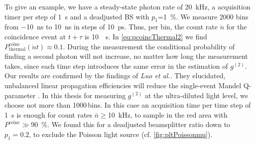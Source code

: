 To give an example, we have a steady-state photon rate of \SI{20}{\kHz}, a acquisition timer per step of \SI{1}{\s} and a deadjusted \ac{BS} with $p_1$=\SI{1}{\percent}. We measure 2000 bins from \SI{-10}{\ns} to \SI{+10}{\ns} in steps of \SI{10}{\ps}. Thus, per bin, the count rate $\dot{n}$ for the coincidence event at $t+\tau$ is \SI{10}{\per \s}. In \cref{eq:pcoincThermal2} we find $P_\mathrm{thermal}^\mathrm{coinc}(\dot{n}t)\approx 0.1$. During the measurement the conditional probability of finding a second photon will not increase, no matter how long the measurement takes, since each time step introduces the same error in the estimation of $g^{(2)}$. Our results are confirmed by the findings of \textit{Luo et al.}. They elucidated, unbalanced linear propagation efficiencies will reduce the single-event Mandel Q-parameter \cite{huang_single_2007}. In this thesis for measuring $g^{(2)}$ at the ultra-diluted light level, we choose not more than 1000\,bins. In this case an acquisition time per time step of \SI{1}{\s} is enough for count rates $\bar{n}\geq$\SI{10}{\kHz}, to sample in the red area with $P^\mathrm{coinc}\gg$\SI{90}{\percent}. We found this for a deadjusted beamsplitter ratio down to $p_1=0.2$, to exclude the Poisson light source (cf. \cref{fig:pltPoissonmu}).


